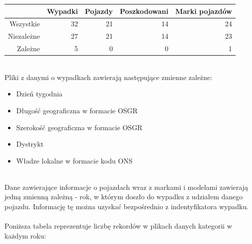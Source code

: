 \documentclass{article}
\begin{document}
\begin{tabular}{|r|r|r|r|r|}
  \hline 
    & Wypadki & Pojazdy & Poszkodowani & Marki pojazdów\\
  \hline 
  Wszystkie & 32 & 21 & 14 & 24\\
  \hline
  Niezależne & 27 & 21 & 14 & 23\\
  \hline
  Zależne & 5 & 0 & 0 & 1\\
  \hline
\end{tabular} \\[0.5cm]
Pliki z danymi o wypadkach zawierają następujące zmienne zależne: %
\begin{itemize}
    \item  Dzień tygodnia
    \item  Długość geograficzna w formacie OSGR 
    \item  Szerokość geograficzna w formacie OSGR 
    \item  Dystrykt
    \item  Władze lokalne w formacie kodu ONS
\end{itemize}\\
Dane zawierające informacje o pojazdach wraz z markami i modelami zawierają jedną zmienną zależną - rok, w którym doszło do wypadku z udziałem danego pojazdu. Informację tę można uzyskać bezpośrednio z indentyfikatora wypadku.\\\\
Poniższa tabela reprezentuje liczbę rekordów w plikach danych kategorii w każdym roku:\\
\end{document}
